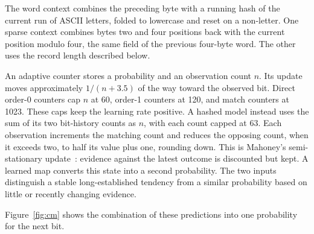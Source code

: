 \documentclass[10pt,letterpaper]{article}
\begin{document}
The word context combines the preceding byte with a running hash of the current run of ASCII letters, folded to lowercase and reset on a non-letter. One sparse context combines bytes two and four positions back with the current position modulo four, the same field of the previous four-byte word. The other uses the record length described below.

An adaptive counter stores a probability and an observation count $n$. Its update moves approximately $1/(n+3.5)$ of the way toward the observed bit. Direct order-0 counters cap $n$ at 60, order-1 counters at 120, and match counters at 1023. These caps keep the learning rate positive. A hashed model instead uses the sum of its two bit-history counts as $n$, with each count capped at 63. Each observation increments the matching count and reduces the opposing count, when it exceeds two, to half its value plus one, rounding down. This is Mahoney's semi-stationary update~\cite{mahoney}: evidence against the latest outcome is discounted but kept. A learned map converts this state into a second probability. The two inputs distinguish a stable long-established tendency from a similar probability based on little or recently changing evidence.

Figure~\ref{fig:cm} shows the combination of these predictions into one probability for the next bit.
\end{document}
